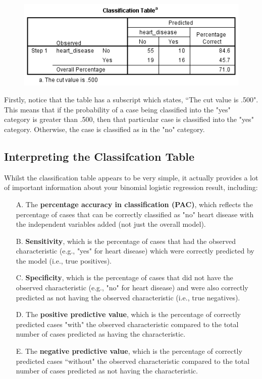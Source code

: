 \documentclass[a4paper,12pt]{article}
\begin{document}
\begin{figure}
\centering
\includegraphics[width=0.7\linewidth]{images/BLogReg-Table}
\caption{}
\label{fig:BLogReg-Table}
\end{figure}



Firstly, notice that the table has a subscript which states, ``The cut value is .500". This means that if the probability of a case being classified into the "yes" category is greater than .500, then that particular case is classified into the "yes" category. 
Otherwise, the case is classified as in the "no" category. 

\subsection{Interpreting the Classifcation Table}
Whilst the classification table appears to be very simple, it actually provides a lot of important information about your binomial logistic regression result, including:


\begin{itemize}
	\item[A.] The \textbf{percentage accuracy in classification (PAC)}, which reflects the percentage of cases that can be correctly classified as "no" heart disease with the independent variables added (not just the overall model).
	\item[B.] \textbf{Sensitivity}, which is the percentage of cases that had the observed characteristic (e.g., "yes" for heart disease) which were correctly predicted by the model (i.e., true positives).
	\item[C.] \textbf{Specificity}, which is the percentage of cases that did not have the observed characteristic (e.g., "no" for heart disease) and were also correctly predicted as not having the observed characteristic (i.e., true negatives).
	\item[D.] The \textbf{positive predictive value}, which is the percentage of correctly predicted cases "with" the observed characteristic compared to the total number of cases predicted as having the characteristic.
	\item[E.] The \textbf{negative predictive value}, which is the percentage of correctly predicted cases ``without" the observed characteristic compared to the total number of cases predicted as not having the characteristic.
\end{itemize}
\end{document}
